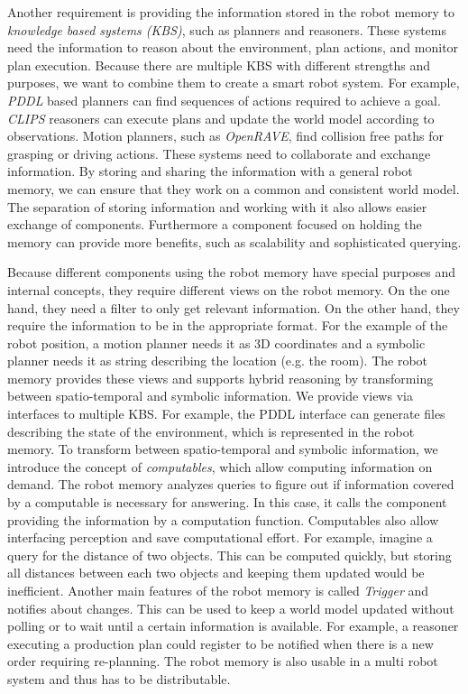 Another requirement is providing the information stored in the robot
memory to \emph{knowledge based systems (KBS)}, such as planners and
reasoners. These systems need the information to reason about the
environment, plan actions, and monitor plan execution. Because there
are multiple KBS with different strengths and purposes, we want to
combine them to create a smart robot system. For example, \emph{PDDL}
based planners can find sequences of actions required to achieve a
goal. \emph{CLIPS} reasoners can execute plans and update the world
model according to observations. Motion planners, such as
\emph{OpenRAVE}, find collision free paths for grasping or driving
actions. These systems need to collaborate and exchange
information. By storing and sharing the information with a general
robot memory, we can ensure that they work on a common and consistent
world model. The separation of storing information and working with it
also allows easier exchange of components. Furthermore a component
focused on holding the memory can provide more benefits, such as
scalability and sophisticated querying.

Because different components using the robot memory have special
purposes and internal concepts, they require different views on the
robot memory. On the one hand, they need a filter to only get relevant
information. On the other hand, they require the information to be in
the appropriate format. For the example of the robot position, a
motion planner needs it as 3D coordinates and a symbolic planner needs
it as string describing the location (e.g. the room). The robot memory
provides these views and supports hybrid reasoning by transforming
between spatio-temporal and symbolic information. We provide views via
interfaces to multiple KBS. For example, the PDDL interface can
generate files describing the state of the environment, which is
represented in the robot memory.  To transform between spatio-temporal
and symbolic information, we introduce the concept of
\emph{computables}, which allow computing information on demand. The
robot memory analyzes queries to figure out if information covered by
a computable is necessary for answering. In this case, it calls the
component providing the information by a computation
function. Computables also allow interfacing perception and save
computational effort. For example, imagine a query for the distance of
two objects. This can be computed quickly, but storing all distances
between each two objects and keeping them updated would be
inefficient.
%
Another main features of the robot memory is called \emph{Trigger} and
notifies about changes. This can be used to keep a world model updated
without polling or to wait until a certain information is
available. For example, a reasoner executing a production plan could
register to be notified when there is a new order requiring
re-planning. The robot memory is also usable in a multi robot
system and thus has to be distributable.


